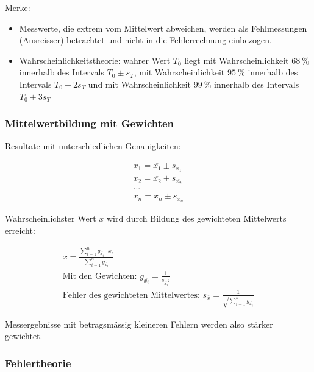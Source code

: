 Merke:

\begin{itemize}
    \item
        Messwerte,   die  extrem   vom   Mittelwert   abweichen,  werden   als
        Fehlmessungen (Ausreisser) betrachtet und  nicht in die Fehlerrechnung
        einbezogen.
    \item
        Wahrscheinlichkeitstheorie:    wahrer    Wert    $T_0$    liegt    mit
        Wahrscheinlichkeit  $\SI{68}{\percent}$ innerhalb  des Intervals  $T_0
        \pm   s_T$,  mit   Wahrscheinlichkeit  $\SI{95}{\percent}$   innerhalb
        des   Intervals    $T_0 \pm  2  s_T$   und    mit   Wahrscheinlichkeit
        $\SI{99}{\percent}$ innerhalb des Intervals $T_0 \pm 3 s_T$
\end{itemize}

\subsubsection{Mittelwertbildung mit Gewichten}

Resultate mit unterschiedlichen Genauigkeiten:

\begin{gather*}
    x_1 = \overline{x_1} \pm s_{\overline{x_1}} \\
    x_2 = \overline{x_2} \pm s_{\overline{x_2}} \\
    \text{...} \\
    x_n = \overline{x_n} \pm s_{\overline{x_n}}
\end{gather*}

Wahrscheinlichster  Wert $\overline{x}$  wird  durch  Bildung des  gewichteten
Mittelwerts erreicht:

\begin{gather*}
    \overline{x} = \frac{ \sum_{i=1}^n{ g_{\overline{x_i}} \cdot x_i } }{ \sum_{i=1}^n{ g_{\overline{x_i}} }{  } } \\
    \text{Mit den Gewichten: } g_{\overline{x_i}} = \frac{1}{s_{\overline{x_i}^2}} \\
    \text{Fehler des gewichteten Mittelwertes: } s_{\overline{x}} = \frac{1}{\sqrt{\sum_{i=1}^n{g_{\overline{x_i}}}}}
\end{gather*}

Messergebnisse  mit betragsm\"assig  kleineren Fehlern  werden also  st\"arker
gewichtet.

\subsubsection{Fehlertheorie}

